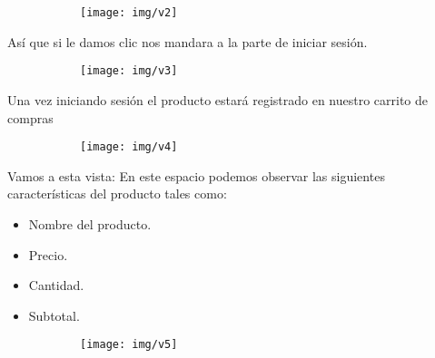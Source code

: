 \documentclass[letterpaper,12pt]{article}
\begin{document}
	\begin{figure}[H]

		\begin{subfigure}{20cm}

			\centering

			\texttt{[image: img/v2]}

		\end{subfigure}

	\end{figure}

	Así que si le damos clic nos mandara a la parte de iniciar sesión.
	
	\begin{figure}[H]

		\begin{subfigure}{20cm}

			\centering

			\texttt{[image: img/v3]}

		\end{subfigure}

	\end{figure}

	Una vez iniciando sesión el producto estará registrado en nuestro carrito de compras
	
	\begin{figure}[H]

		\begin{subfigure}{20cm}

			\centering

			\texttt{[image: img/v4]}

		\end{subfigure}

	\end{figure}

	Vamos a esta vista:
	En este espacio podemos observar las siguientes características del producto tales como:
	
	\begin{itemize}
		\item Nombre del producto.
		\item Precio.
		\item Cantidad.
		\item Subtotal.
	\end{itemize}

	\begin{figure}[H]

		\begin{subfigure}{20cm}

			\centering

			\texttt{[image: img/v5]}

		\end{subfigure}

	\end{figure}
\end{document}
